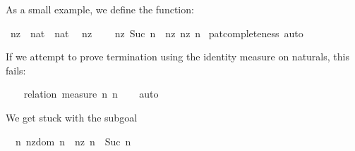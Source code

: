\begin{isabellebody}
\begin{isamarkuptext}
  As a small example, we define the  function:%
\end{isamarkuptext}%
\isamarkuptrue%
\isamarkupfalse%
\ nz\ {}{}\ {}nat\ {}\ nat{}\isanewline
{}\isanewline
\ \ {}nz\ {}\ {}\ {}{}\isanewline
{}\ {}nz\ {}Suc\ n{}\ {}\ nz\ {}nz\ n{}{}\isanewline
%
\isadelimproof
%
\endisadelimproof
%
\isatagproof
{}\isamarkupfalse%
\ pat{}completeness\ auto%
\endisatagproof
{\isafoldproof}%
%
\isadelimproof
%
\endisadelimproof
%
\begin{isamarkuptext}%
If we attempt to prove termination using the identity measure on
  naturals, this fails:%
\end{isamarkuptext}%
\isamarkuptrue%
\isamarkupfalse%
\isanewline
%
\isadelimproof
\ \ %
\endisadelimproof
%
\isatagproof
{}\isamarkupfalse%
\ {}relation\ {}measure\ {}{}n{}\ n{}{}{}\isanewline
\ \ \isamarkupfalse%
\ auto%
\begin{isamarkuptxt}%
We get stuck with the subgoal

  \begin{isabelle}%
\ {}{}\ {}n{}\ nz{}dom\ n\ {}\ nz\ n\ {}\ Suc\ n%
\end{isabelle}


\end{isamarkuptxt}
\end{isabellebody}
